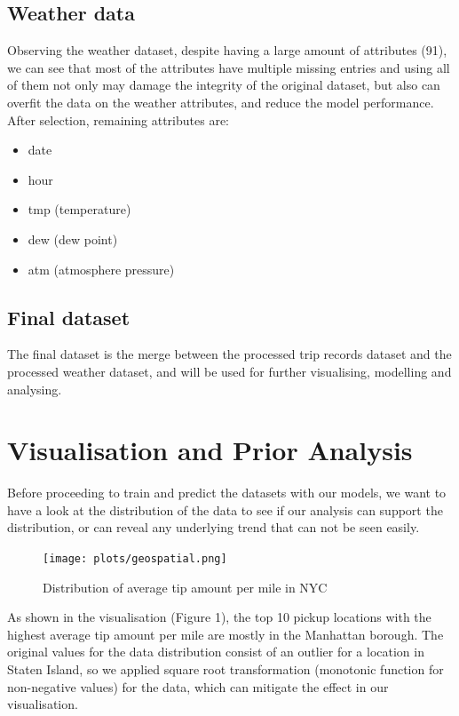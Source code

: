 \documentclass[11pt]{article}
\begin{document}
\subsection{Weather data}

Observing the weather dataset, despite having a large amount of attributes (91), we can see that most of the attributes have multiple missing entries and using all of them not only may damage the integrity of the original dataset, but also can overfit the data on the weather attributes, and reduce the model performance. After selection\cite{sample_solution}, remaining attributes are:

\begin{itemize}
    \item date
    \item hour
    \item tmp (temperature)
    \item dew (dew point)
    \item atm (atmosphere pressure)
\end{itemize}

\subsection{Final dataset}

The final dataset is the merge between the processed trip records dataset and the processed weather dataset, and will be used for further visualising, modelling and analysing.

\section{Visualisation and Prior Analysis}

Before proceeding to train and predict the datasets with our models, we want to have a look at the distribution of the data to see if our analysis can support the distribution, or can reveal any underlying trend that can not be seen easily.

\begin{figure}[h]
    \texttt{[image: plots/geospatial.png]}
    \centering
    \caption{Distribution of average tip amount per mile in NYC}
\end{figure}

As shown in the visualisation (Figure 1), the top 10 pickup locations with the highest average tip amount per mile are mostly in the Manhattan borough. The original values for the data distribution consist of an outlier for a location in Staten Island, so we applied square root transformation (monotonic function for non-negative values) for the data, which can mitigate the effect in our visualisation.
\end{document}
